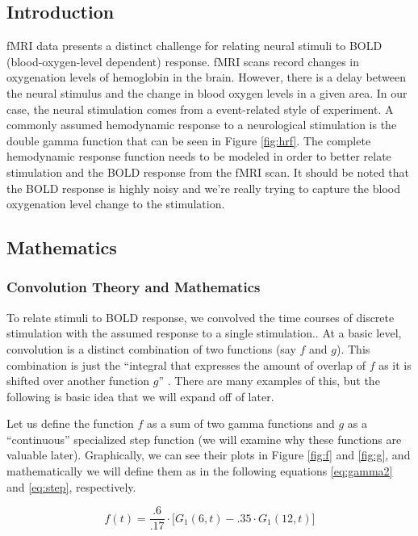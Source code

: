 
\subsection{Introduction}

fMRI data presents a distinct challenge for relating neural stimuli 
to BOLD (blood-oxygen-level dependent) response. fMRI scans record changes 
in oxygenation levels of hemoglobin in the brain. However, there is a delay 
between the neural stimulus and the change in blood oxygen levels in a given 
area. In our case, the neural stimulation comes from a event-related style of 
experiment. A commonly assumed hemodynamic response to a neurological 
stimulation is the double gamma function that can be seen in Figure 
\ref{fig:hrf}. The complete hemodynamic response function needs to be modeled 
in order to better relate stimulation and the BOLD response from the fMRI scan.
It should be noted that the BOLD response is highly noisy and we're really 
trying to capture the blood oxygenation level change to the stimulation.

\subsection{Mathematics}
\subsubsection{Convolution Theory and Mathematics}

To relate stimuli to BOLD response, we convolved the time courses of discrete 
stimulation with the assumed response to a single stimulation.. At a basic 
level, convolution is a distinct combination of two functions (say $f$ and 
$g$). This combination is just the ``integral that expresses the amount of 
overlap of $f$ as it is shifted over another function $g$'' 
\cite{weissten2015convolution}. 
There are many examples of this, but the following is basic idea that we will 
expand off of later. 

Let us define the function $f$ as a sum of two gamma functions and $g$ as a 
``continuous'' specialized step function (we will examine why these functions 
are valuable later). Graphically, we can see their plots in Figure \ref{fig:f}
and \ref{fig:g}, and mathematically we will define them as in the following 
equations \ref{eq:gamma2} and \ref{eq:step}, respectively.

\begin{equation} \label{eq:gamma2}
f(t)=\frac{.6}{.17}\cdot  \big[G_1(6,t)-.35 \cdot G_1(12,t) \big]
\end{equation}

